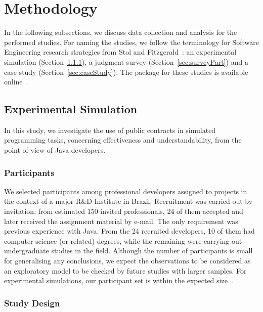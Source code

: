 \section{Methodology}
\label{sec:researchDesign}

In the following subsections, we discuss data collection and analysis for the performed studies. For naming the studies, we follow the terminology for Software Engineering research strategies from Stol and Fitzgerald~\cite{Stol2015}: an experimental simulation (Section~\ref{sec:expPart}), a judgment survey (Section~\ref{sec:surveyPart}) and a case study (Section~\ref{sec:caseStudy}). The package for these studies is available online~\cite{package-bib}.

\subsection{Experimental Simulation}
\label{sec:experiment}

In this study, we investigate the use of
public contracts in simulated programming tasks, concerning effectiveness and understandability, from the point of view of Java developers.

\subsubsection{Participants}
\label{sec:expPart}

We selected participants among professional developers assigned to projects in the context of a major R\&D Institute in Brazil. Recruitment was carried out by invitation; from estimated 150 invited professionals, 24 of them accepted and later received the assignment material by e-mail. The only requirement was previous experience with Java. From the 24 recruited developers, 10 of them had computer science (or related) degrees, while the remaining were carrying out undergraduate studies in the field. 
Although the number of participants is small for generalising any conclusions, we expect the observations to be considered as an exploratory model to be checked by future studies with larger samples. For experimental simulations, our participant set is within the expected size~\cite{Stol2015}.


\subsubsection{Study Design}
\label{sec:studyDesign}

